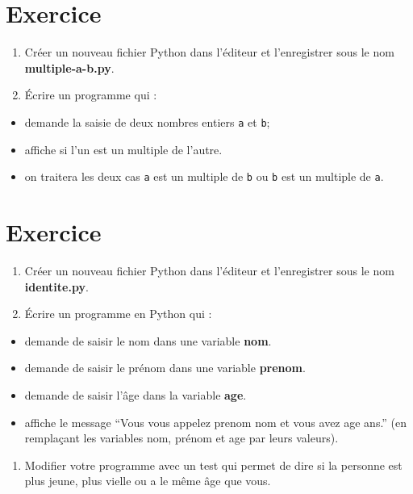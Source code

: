 \documentclass[11pt]{article}
\providecommand{\tightlist}{%
      \setlength{\itemsep}{0pt}\setlength{\parskip}{0pt}}
\begin{document}
    \hypertarget{exercice}{%
\section{Exercice}\label{exercice}}

\begin{enumerate}
\def\labelenumi{\arabic{enumi}.}
\tightlist
\item
  Créer un nouveau fichier Python dans l'éditeur et l'enregistrer sous
  le nom \textbf{multiple-a-b.py}.
\item
  Écrire un programme qui :
\end{enumerate}

\begin{itemize}
\tightlist
\item
  demande la saisie de deux nombres entiers \texttt{a} et \texttt{b};
\item
  affiche si l'un est un multiple de l'autre.
\item
  on traitera les deux cas \texttt{a} est un multiple de \texttt{b} ou
  \texttt{b} est un multiple de \texttt{a}.
\end{itemize}

    \hypertarget{exercice}{%
\section{Exercice}\label{exercice}}

\begin{enumerate}
\def\labelenumi{\arabic{enumi}.}
\tightlist
\item
  Créer un nouveau fichier Python dans l'éditeur et l'enregistrer sous
  le nom \textbf{identite.py}.
\item
  Écrire un programme en Python qui :
\end{enumerate}

\begin{itemize}
\tightlist
\item
  demande de saisir le nom dans une variable \textbf{nom}.
\item
  demande de saisir le prénom dans une variable \textbf{prenom}.
\item
  demande de saisir l'âge dans la variable \textbf{age}.
\item
  affiche le message ``Vous vous appelez prenom nom et vous avez age
  ans.'' (en remplaçant les variables nom, prénom et age par leurs
  valeurs).
\end{itemize}

\begin{enumerate}
\def\labelenumi{\arabic{enumi}.}
\setcounter{enumi}{2}
\tightlist
\item
  Modifier votre programme avec un test qui permet de dire si la
  personne est plus jeune, plus vielle ou a le même âge que vous.
\end{enumerate}
\end{document}
